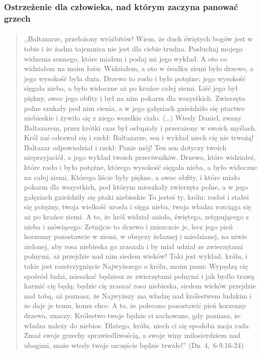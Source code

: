 \documentclass[10pt,a4paper,oneside]{article}
\begin{document}
\subsubsection{Ostrzeżenie dla człowieka, nad którym zaczyna panować grzech}
\paragraph{}
\begin{quote}
,,Baltazarze, przełożony wróżbitów! Wiem, że duch świętych bogów jest w tobie i że żadna tajemnica nie jest dla ciebie trudna. Posłuchaj mojego widzenia sennego, które miałem i podaj mi jego wykład. A oto co widziałem na moim łożu: Widziałem, a oto w środku ziemi było drzewo, a jego wysokość była duża. Drzewo to rosło i było potężne; jego wysokość sięgała nieba, a było widoczne aż po krańce całej ziemi. Liść jego był piękny, owoc jego obfity i był na nim pokarm dla wszystkich. Zwierzęta polne szukały pod nim cienia, a w jego gałęziach gnieździło się ptactwo niebieskie i żywiło się z niego wszelkie ciało. (\ldots) Wtedy Daniel, zwany Baltazarem, przez krótki czas był osłupiały i przerażony w swoich myślach. Król zaś odezwał się i rzekł: Baltazarze, sen i wykład niech cię nie trwożą! Baltazar odpowiedział i rzekł: Panie mój! Ten sen dotyczy twoich nieprzyjaciół, a jego wykład twoich przeciwników. Drzewo, które widziałeś, które rosło i było potężne, którego wysokość sięgała nieba, a było widoczne na całej ziemi, Którego liście były piękne, a owoc obfity, i które miało pokarm dla wszystkich, pod którym mieszkały zwierzęta polne, a w jego gałęziach gnieździły się ptaki niebieskie To jesteś ty, królu: rosłeś i stałeś się potężny, twoja wielkość urosła i sięga nieba, twoja władza rozciąga się aż po krańce ziemi. A to, że król widział anioła, świętego, zstępującego z nieba i mówiącego: Zetnijcie to drzewo i zniszczcie je, lecz jego pień korzenny pozostawcie w ziemi, w obręczy żelaznej i miedzianej, na niwie zielonej, aby rosa niebieska go zraszała i by miał udział ze zwierzętami polnymi, aż przejdzie nad nim siedem wieków! Taki jest wykład, królu, i takie jest rozstrzygnięcie Najwyższego o królu, moim panu: Wypędzą cię spośród ludzi, mieszkać będziesz ze zwierzętami polnymi i jak bydło trawą karmić cię będą; będzie cię zraszać rosa niebieska, siedem wieków przejdzie nad tobą, aż poznasz, że Najwyższy ma władzę nad królestwem ludzkim i że daje je temu, komu chce. A to, że polecono pozostawić pień korzenny drzewa, znaczy: Królestwo twoje będzie ci zachowane, gdy poznasz, że władza należy do niebios. Dlatego, królu, niech ci się spodoba moja rada: Zmaż swoje grzechy sprawiedliwością, a swoje winy miłosierdziem nad ubogimi, może wtedy twoje szczęście będzie trwałe!'' \mbox{(Dn 4, 6-9.16-24)}
\end{quote}
\end{document}
